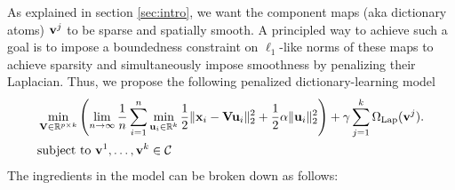 As explained in section \ref{sec:intro}, we want the component maps (aka dictionary atoms) $\mathbf{v}^j$ to be sparse and spatially smooth. A principled way to achieve such a goal is to impose a boundedness constraint on $\ell_1$-like norms of these maps to achieve sparsity and
simultaneously impose smoothness by penalizing their Laplacian.
Thus, we propose the following penalized dictionary-learning model
\begin{eqnarray}
\begin{split}
  &\min_{\mathbf{V} \in \mathbb R^{p \times k}}\left(\lim_{n \rightarrow \infty}\frac{1}{n}\sum_{i=1}^n\min_{\mathbf{u}_i \in \mathbb R^{k}}\frac{1}{2} \|\mathbf{x}_i-\mathbf{V}\mathbf{u}_i\|_2^2 +  \frac{1}{2}\alpha\|\mathbf{u}_i\|_2^2\right) + \gamma\sum_{j=1}^k\Omega_{\text{Lap}}(\mathbf{v}^j).\\
  &\text{subject to }\mathbf{v}^1,\ldots,\mathbf{v}^k \in \mathcal C
\end{split}
\label{eq:ss}
\end{eqnarray}
The ingredients in the model can be broken down as follows:
